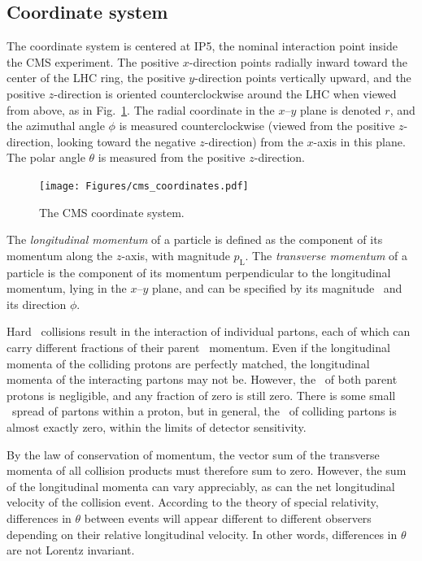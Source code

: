 \subsection{Coordinate system} \label{sec:LHCCMS_CMS_coordinates}
The coordinate system is centered at IP5, the nominal interaction point inside the CMS experiment.
The positive $x$-direction points radially inward toward the center of the LHC ring, the positive $y$-direction
points vertically upward, and the positive $z$-direction is oriented counterclockwise around the LHC when viewed
from above, as in Fig.~\ref{fig:cms_coordinates}.
The radial coordinate in the $x$--$y$ plane is denoted $r$, and the azimuthal angle $\phi$ is measured counterclockwise
(viewed from the positive $z$-direction, looking toward the negative $z$-direction) from the $x$-axis in this plane.
The polar angle $\theta$ is measured from the positive $z$-direction.

\begin{figure}[hbtp]
  \begin{center}
    \texttt{[image: Figures/cms\_coordinates.pdf]}
    \caption{
    The CMS coordinate system.
    }
    \label{fig:cms_coordinates}
  \end{center}
\end{figure}

The \textit{longitudinal momentum} of a particle is defined as the component of its momentum along the $z$-axis, with
magnitude $p_\mathrm{L}$. The \textit{transverse momentum} of a particle is the component of its momentum perpendicular
to the longitudinal momentum, lying in the $x$--$y$ plane,
and can be specified by its magnitude \pT\ and its direction $\phi$.

Hard \Pp\Pp\ collisions
result in the interaction of individual partons, each of which can carry different fractions of their
parent \Pp\ momentum. Even if the longitudinal momenta of the colliding protons are perfectly matched,
the longitudinal momenta of the interacting partons may not be. However, the \pT\ of
both parent protons is negligible, and any fraction of zero is still zero. There is some small
\pT\ spread of partons within a proton, but in general, the \pT\ of colliding partons is almost exactly zero, within the limits of detector sensitivity.

By the law of conservation of momentum, the vector sum of the
transverse momenta of all collision products must therefore sum to zero. However, the sum of the longitudinal momenta
can vary appreciably, as can the net longitudinal velocity of the collision event. According
to the theory of special relativity, differences in $\theta$ between events will appear different
to different observers depending on their relative longitudinal velocity. In other words, differences in $\theta$ are not Lorentz invariant.

